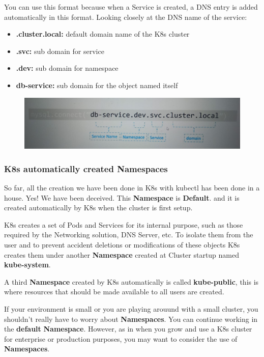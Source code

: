 \documentclass{article}
\begin{document}
You can use this format because when a Service is created, a DNS entry is added automatically in this format. Looking closely at the DNS name of the service:
\begin{itemize}
    \item \textbf{.cluster.local:} default domain name of the K8s cluster
    \item \textbf{.svc:} sub domain for service
    \item \textbf{.dev:} sub domain for namespace
    \item \textbf{db-service:} sub domain for the object named itself
\end{itemize}

\begin{figure}[H]
    \centering
    \includegraphics[scale=0.3]{pictures/namespace4.jpeg}
\end{figure}

\subsubsection{K8s automatically created Namespaces}

So far, all the creation we have been done in K8s with kubectl has been done in a house. Yes! We have been deceived. This \textbf{Namespace} is \textbf{Default}. and it is created automatically by K8s when the cluster is first setup. 

K8s creates a set of Pods and Services for its internal purpose, such as those required by the Networking solution, DNS Server, etc. To isolate them from the user and to prevent accident deletions or modifications of these objects K8s creates them under another \textbf{Namespace} created at Cluster startup named \textbf{kube-system}.

A third \textbf{Namespace} created by K8s automatically is called \textbf{kube-public}, this is where resources that should be made available to all users are created.

If your environment is small or you are playing arouund with a small cluster, you shouldn't really have to worry about \textbf{Namespaces}. You can continue working in the \textbf{default} \textbf{Namespace}. However, as in when you grow and use a K8s cluster for enterprise or production purposes, you may want to consider the use of \textbf{Namespaces}.
\end{document}
